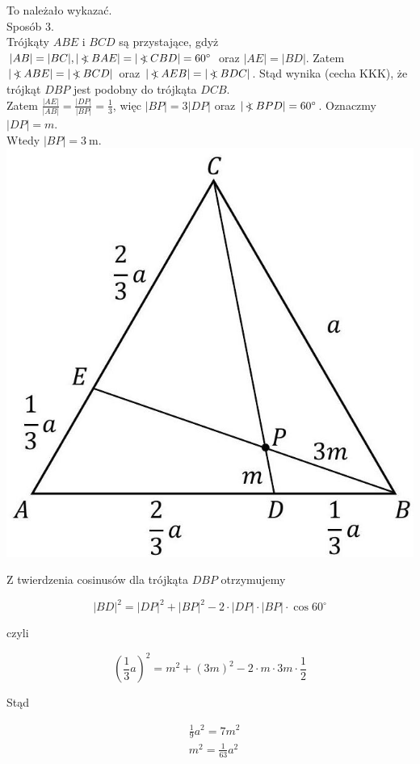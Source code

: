 \documentclass[10pt]{article}
\newcommand\Varangle{\mathop{{<\!\!\!\!\!\text{\small)}}\:}\nolimits}
\begin{document}
To należało wykazać.\\
Sposób 3.\\
Trójkąty $A B E$ i $B C D$ są przystające, gdyż $|A B|=|B C|,|\Varangle B A E|=|\Varangle C B D|=60^{\circ}$ oraz $|A E|=|B D|$. Zatem $|\Varangle A B E|=|\Varangle B C D|$ oraz $|\Varangle A E B|=|\Varangle B D C|$. Stąd wynika (cecha KKK), że trójkąt $D B P$ jest podobny do trójkąta $D C B$.\\
Zatem $\frac{|A E|}{|A B|}=\frac{|D P|}{|B P|}=\frac{1}{3}$, więc $|B P|=3|D P|$ oraz $|\Varangle B P D|=60^{\circ}$. Oznaczmy $|D P|=m$.\\
Wtedy $|B P|=3 \mathrm{~m}$.\\
\includegraphics[max width=\textwidth, center]{2025_02_07_36131546116d12814c9cg-13}

Z twierdzenia cosinusów dla trójkąta $D B P$ otrzymujemy

$$
|B D|^{2}=|D P|^{2}+|B P|^{2}-2 \cdot|D P| \cdot|B P| \cdot \cos 60^{\circ}
$$

czyli

$$
\left(\frac{1}{3} a\right)^{2}=m^{2}+(3 m)^{2}-2 \cdot m \cdot 3 m \cdot \frac{1}{2}
$$

Stąd

$$
\begin{aligned}
& \frac{1}{9} a^{2}=7 m^{2} \\
& m^{2}=\frac{1}{63} a^{2}
\end{aligned}
$$
\end{document}
